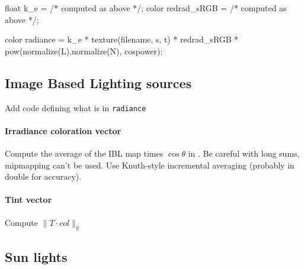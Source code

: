 \begin{rslcode}
float k_e = /* computed as above */;
color redrad_sRGB = /* computed as above */;

color radiance =
    k_e *
    texture(filename, s, t) *
    redrad_sRGB *
    pow(normalize(L).normalize(N), cospower);
\end{rslcode}

\subsection{Image Based Lighting sources}

\begin{inconstruction}
    Add code defining what is in \Verb|radiance|

    \paragraph{Irradiance coloration vector}

    Compute the average of the \gls{IBL} map times $\cos\theta$ in \sRGBl. Be
    careful with long sums, mipmapping can't be used. Use Knuth-style
    incremental averaging (probably in double for accuracy).

    \paragraph{Tint vector}

    Compute $\|T \cdot col\|_{\bar y}$
\end{inconstruction}

\subsection{Sun lights}

